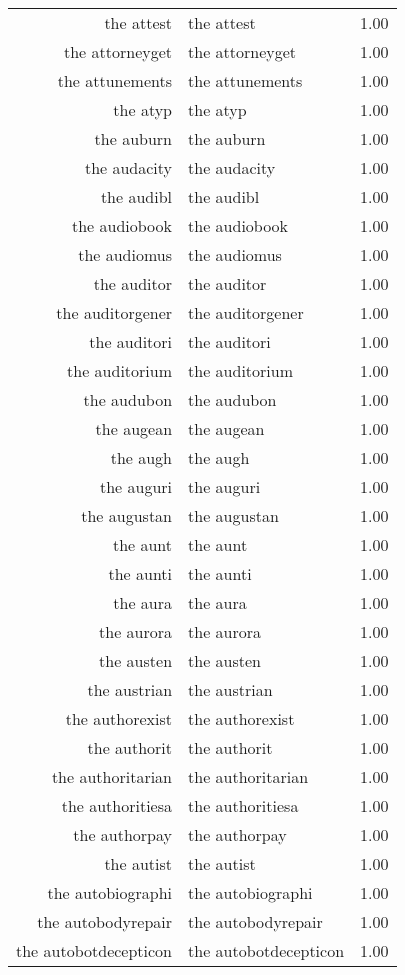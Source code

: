 \begin{table}[ht]
\begin{tabular}{rlr}
  the attest & the attest & 1.00 \\ 
  the attorneyget & the attorneyget & 1.00 \\ 
  the attunements & the attunements & 1.00 \\ 
  the atyp & the atyp & 1.00 \\ 
  the auburn & the auburn & 1.00 \\ 
  the audacity & the audacity & 1.00 \\ 
  the audibl & the audibl & 1.00 \\ 
  the audiobook & the audiobook & 1.00 \\ 
  the audiomus & the audiomus & 1.00 \\ 
  the auditor & the auditor & 1.00 \\ 
  the auditorgener & the auditorgener & 1.00 \\ 
  the auditori & the auditori & 1.00 \\ 
  the auditorium & the auditorium & 1.00 \\ 
  the audubon & the audubon & 1.00 \\ 
  the augean & the augean & 1.00 \\ 
  the augh & the augh & 1.00 \\ 
  the auguri & the auguri & 1.00 \\ 
  the augustan & the augustan & 1.00 \\ 
  the aunt & the aunt & 1.00 \\ 
  the aunti & the aunti & 1.00 \\ 
  the aura & the aura & 1.00 \\ 
  the aurora & the aurora & 1.00 \\ 
  the austen & the austen & 1.00 \\ 
  the austrian & the austrian & 1.00 \\ 
  the authorexist & the authorexist & 1.00 \\ 
  the authorit & the authorit & 1.00 \\ 
  the authoritarian & the authoritarian & 1.00 \\ 
  the authoritiesa & the authoritiesa & 1.00 \\ 
  the authorpay & the authorpay & 1.00 \\ 
  the autist & the autist & 1.00 \\ 
  the autobiographi & the autobiographi & 1.00 \\ 
  the autobodyrepair & the autobodyrepair & 1.00 \\ 
  the autobotdecepticon & the autobotdecepticon & 1.00 \\ 

\end{tabular}
\end{table}

